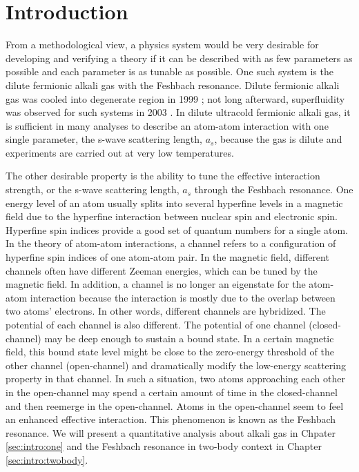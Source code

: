
\chapter{Introduction}
From  a methodological view, a physics system  would be very desirable for developing and  verifying a theory  if  it can be described with  as few parameters as possible and  each parameter  is as tunable as possible. One such system is the dilute fermionic alkali gas with the Feshbach resonance.  Dilute fermionic alkali gas was cooled into degenerate region in 1999 \cite{DeMarco1999}; not long afterward,  superfluidity was observed for such systems in 2003 \cite{Regal2003}.  In dilute ultracold fermionic alkali gas, it is sufficient in many analyses to describe an atom-atom interaction with one single parameter, the s-wave scattering length, $a_{s}$, because the gas is dilute and experiments are carried out at very low temperatures.       

The other desirable property is the ability to  tune the effective interaction strength, or the s-wave scattering length, $a_{s}$ through the Feshbach resonance.  One energy level of an atom  usually splits into several hyperfine levels in a magnetic field  due to the hyperfine interaction between nuclear spin and electronic spin. Hyperfine spin indices provide a good set of quantum numbers for a single atom.  In the theory of  atom-atom interactions, a channel refers to a  configuration of hyperfine spin indices of one atom-atom pair. In the magnetic field, different channels often have different Zeeman energies, which can be tuned by the magnetic field.  In addition, a channel is no longer an eigenstate for the atom-atom interaction because the interaction is mostly due to the overlap between two atoms' electrons.  In other words, different channels are hybridized.  The potential of each channel is also different.  The potential of one  channel (closed-channel) may be deep enough to sustain a bound state.  In a certain magnetic field,  this bound state level might be close to the zero-energy threshold of the other channel (open-channel) and  dramatically modify the low-energy scattering property in that channel.   In such a situation, two atoms approaching each other in the open-channel may spend a certain amount of time in the closed-channel and then reemerge in the open-channel.  Atoms in the open-channel seem to feel an enhanced effective interaction.  This phenomenon is known as the Feshbach resonance.    We will present a  quantitative analysis about alkali gas in Chpater \ref{sec:intro:one} and the Feshbach resonance in two-body context in Chapter \ref{sec:intro:twobody}. 




